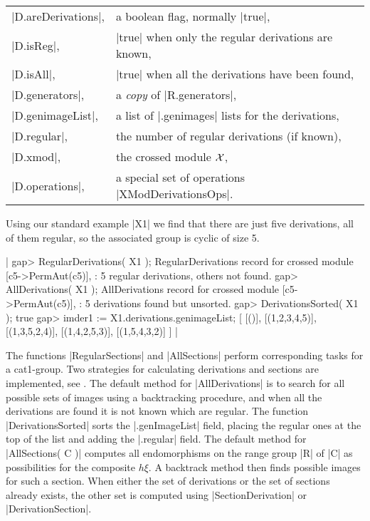 \begin{tabular}{ll}
|D.areDerivations|,  & a boolean flag, normally |true|,                    \\
|D.isReg|,           & |true| when only the regular derivations are known, \\
|D.isAll|,           & |true| when all the derivations have been found,    \\
|D.generators|,      & a \emph{copy} of |R.generators|,                    \\
|D.genimageList|,    & a list of |.genimages| lists for the derivations,   \\
|D.regular|,         & the number of regular derivations (if known),       \\
|D.xmod|,            & the crossed module ${\cal X}$,                      \\
|D.operations|,      & a special set of operations |XModDerivationsOps|.
\end{tabular}

Using our standard example |X1| we find that there are just five derivations,
all of them regular, so the associated group is cyclic of size 5.

|    gap> RegularDerivations( X1 );
    RegularDerivations record for crossed module [c5->PermAut(c5)],
    : 5 regular derivations, others not found.
    gap> AllDerivations( X1 );
    AllDerivations record for crossed module [c5->PermAut(c5)],
    : 5 derivations found but unsorted.
    gap> DerivationsSorted( X1 );
    true
    gap> imder1 := X1.derivations.genimageList;
    [ [()], [(1,2,3,4,5)], [(1,3,5,2,4)], [(1,4,2,5,3)], [(1,5,4,3,2)] ] |

The functions |RegularSections| and |AllSections| perform corresponding 
tasks for a cat1-group.
Two strategies for calculating derivations and sections are implemented,
see \cite{AW1}.
The default method for |AllDerivations| is to search for all possible
sets of images using a backtracking procedure, and when all the derivations
are found it is not known which are regular.
The function |DerivationsSorted| sorts the |.genImageList| field, placing
the regular ones at the top of the list and adding the |.regular| field.
The default method for |AllSections( C )| computes all endomorphisms
on the range group |R| of |C| as possibilities for the composite $h\xi$.
A backtrack method then finds possible images for such a section.
When either the set of derivations or the set of sections already exists, 
the other set is computed using |SectionDerivation| or |DerivationSection|.


